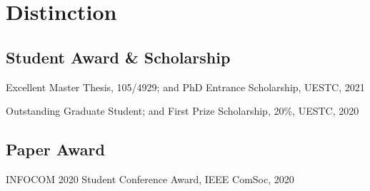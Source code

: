 \section*{Distinction}


\subsection*{\hspace{1.6em}Student Award \& Scholarship}
\indent

Excellent Master Thesis, 105/4929; and PhD Entrance Scholarship, UESTC, 2021

Outstanding Graduate Student; and First Prize Scholarship, 20\%, UESTC, 2020

\subsection*{\hspace{1.6em}Paper Award}
\indent

INFOCOM 2020 Student Conference Award, IEEE ComSoc, 2020

